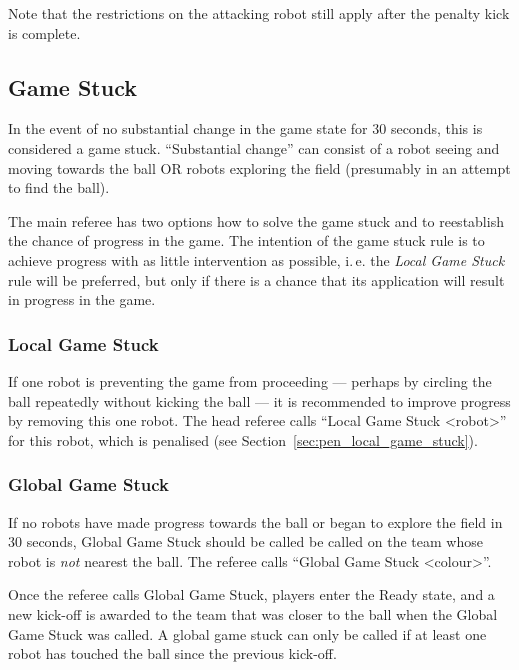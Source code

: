 \documentclass[12pt]{article}
\newcommand{\ie}{\mbox{i.\,e.}\xspace}
\newcommand{\cf}{see\xspace}
\begin{document}
Note that the restrictions on the attacking robot still apply after the penalty kick is complete.

\subsection{Game Stuck}
\label{sec:game_stuck}

In the event of no substantial change in the game state for 30 seconds, this is considered a game stuck.  ``Substantial change'' can consist of a robot seeing and moving towards the ball OR robots exploring the field (presumably in an attempt to find the ball).

The main referee has two options how to solve the game stuck and to reestablish the chance of progress in the game. The intention of the game stuck rule is to achieve progress with as little intervention as possible, \ie the \emph{Local Game Stuck} rule will be preferred, but only if there is a chance that its application will result in progress in the game.

\subsubsection{Local Game Stuck}
\label{sec:game_stuck:local}

If one robot is preventing the game from proceeding --- perhaps by circling the ball repeatedly without kicking the ball --- it is recommended to improve progress by removing this one robot.
The head referee calls ``Local Game Stuck \textless robot\textgreater'' for this robot, which is penalised (\cf Section~\ref{sec:pen_local_game_stuck}).

\subsubsection{Global Game Stuck}
\label{sec:game_stuck:global}

If no robots have made progress towards the ball or began to explore the field in 30 seconds, Global Game Stuck should be called be called on the team whose robot is \textit{not} nearest the ball.
The referee calls ``Global Game Stuck \textless colour\textgreater''.

Once the referee calls Global Game Stuck, players enter the Ready state, and a new kick-off is awarded to the team that was closer to the ball when the Global Game Stuck was called. A global game stuck can only be called if at least one robot has touched the ball since the previous kick-off.
\end{document}
